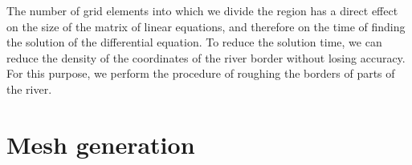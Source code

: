 \documentclass[]{pracamgr}
\begin{document}
      The number of grid elements into which we divide the region has a direct effect on the size of the matrix of linear equations, and therefore on the time of finding the solution of the differential equation. To reduce the solution time, we can reduce the density of the coordinates of the river border without losing accuracy. For this purpose, we perform the procedure of roughing the borders of parts of the river. 

    \section{Mesh generation}
\end{document}
